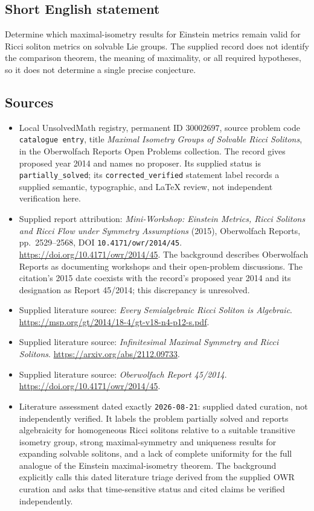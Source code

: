 \documentclass[11pt]{article}
\begin{document}
\subsection{Short English statement}
Determine which maximal-isometry results for Einstein metrics remain valid for Ricci soliton metrics on solvable Lie groups. The supplied record does not identify the comparison theorem, the meaning of maximality, or all required hypotheses, so it does not determine a single precise conjecture.
\subsection{Sources}
\begin{itemize}
\item Local UnsolvedMath registry, permanent ID \(30002697\), source problem code \texttt{catalogue entry}, title \emph{Maximal Isometry Groups of Solvable Ricci Solitons}, in the Oberwolfach Reports Open Problems collection. The record gives proposed year 2014 and names no proposer. Its supplied status is \texttt{partially\_solved}; its \texttt{corrected\_verified} statement label records a supplied semantic, typographic, and LaTeX review, not independent verification here.
\item Supplied report attribution: \emph{Mini-Workshop: Einstein Metrics, Ricci Solitons and Ricci Flow under Symmetry Assumptions} (2015), Oberwolfach Reports, pp.~2529--2568, DOI \texttt{10.4171/owr/2014/45}. \url{https://doi.org/10.4171/owr/2014/45}. The background describes Oberwolfach Reports as documenting workshops and their open-problem discussions. The citation's 2015 date coexists with the record's proposed year 2014 and its designation as Report 45/2014; this discrepancy is unresolved.
\item Supplied literature source: \emph{Every Semialgebraic Ricci Soliton is Algebraic}. \url{https://msp.org/gt/2014/18-4/gt-v18-n4-p12-s.pdf}.
\item Supplied literature source: \emph{Infinitesimal Maximal Symmetry and Ricci Solitons}. \url{https://arxiv.org/abs/2112.09733}.
\item Supplied literature source: \emph{Oberwolfach Report 45/2014}. \url{https://doi.org/10.4171/owr/2014/45}.
\item Literature assessment dated exactly \texttt{2026-08-21}: supplied dated curation, not independently verified. It labels the problem partially solved and reports algebraicity for homogeneous Ricci solitons relative to a suitable transitive isometry group, strong maximal-symmetry and uniqueness results for expanding solvable solitons, and a lack of complete uniformity for the full analogue of the Einstein maximal-isometry theorem. The background explicitly calls this dated literature triage derived from the supplied OWR curation and asks that time-sensitive status and cited claims be verified independently.
\end{itemize}
\end{document}
